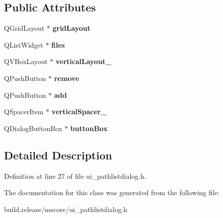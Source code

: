 \subsection*{Public Attributes}
\begin{DoxyCompactItemize}
\item 
\mbox{\label{class_ui___path_list_dialog_a191e729e8c136ead5f62d37b077b6f43}} 
Q\+Grid\+Layout $\ast$ {\bfseries grid\+Layout}
\item 
\mbox{\label{class_ui___path_list_dialog_ac737cccaa740d93ecc588211a22b517b}} 
Q\+List\+Widget $\ast$ {\bfseries files}
\item 
\mbox{\label{class_ui___path_list_dialog_a95cb8a9fcba303f210e1822236fc9e76}} 
Q\+V\+Box\+Layout $\ast$ {\bfseries vertical\+Layout\+\_}
\item 
\mbox{\label{class_ui___path_list_dialog_aab9efc6f10a6b6956daf057676c749a7}} 
Q\+Push\+Button $\ast$ {\bfseries remove}
\item 
\mbox{\label{class_ui___path_list_dialog_a4f223cd611d36a32e8a8cb34dc726f12}} 
Q\+Push\+Button $\ast$ {\bfseries add}
\item 
\mbox{\label{class_ui___path_list_dialog_a8ae221ff53441500647bdda57f4595ef}} 
Q\+Spacer\+Item $\ast$ {\bfseries vertical\+Spacer\+\_}
\item 
\mbox{\label{class_ui___path_list_dialog_a6cff25b929edabcbef1606bc63aae8d8}} 
Q\+Dialog\+Button\+Box $\ast$ {\bfseries button\+Box}
\end{DoxyCompactItemize}


\subsection{Detailed Description}


Definition at line 27 of file ui\+\_\+pathlistdialog.\+h.



The documentation for this class was generated from the following file\+:\begin{DoxyCompactItemize}
\item 
build.\+release/mscore/ui\+\_\+pathlistdialog.\+h\end{DoxyCompactItemize}
